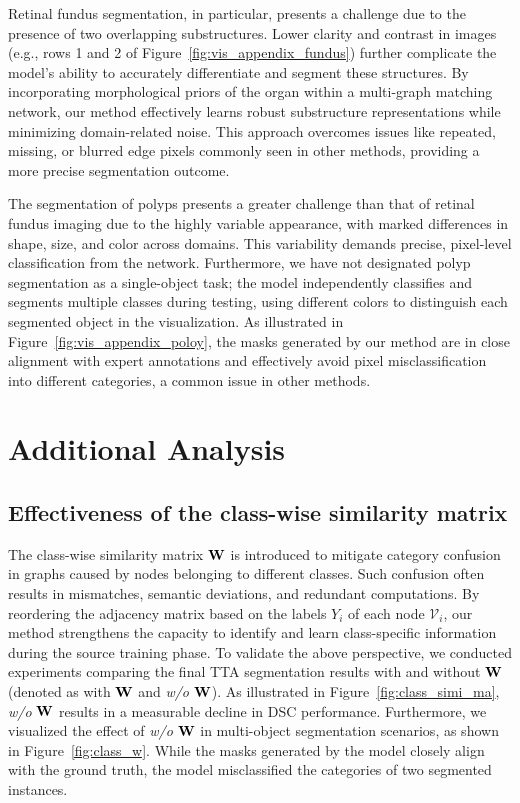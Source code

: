 Retinal fundus segmentation, in particular, presents a challenge due to the presence of two overlapping substructures. Lower clarity and contrast in images (e.g., rows 1 and 2 of Figure~\ref{fig:vis_appendix_fundus}) further complicate the model’s ability to accurately differentiate and segment these structures. By incorporating morphological priors of the organ within a multi-graph matching network, our method effectively learns robust substructure representations while minimizing domain-related noise. This approach overcomes issues like repeated, missing, or blurred edge pixels commonly seen in other methods, providing a more precise segmentation outcome.

The segmentation of polyps presents a greater challenge than that of retinal fundus imaging due to the highly variable appearance, with marked differences in shape, size, and color across domains. This variability demands precise, pixel-level classification from the network. Furthermore, we have not designated polyp segmentation as a single-object task; the model independently classifies and segments multiple classes during testing, using different colors to distinguish each segmented object in the visualization. As illustrated in Figure~\ref{fig:vis_appendix_poloy}, the masks generated by our method are in close alignment with expert annotations and effectively avoid pixel misclassification into different categories, a common issue in other methods.

\section{Additional Analysis}
\subsection{Effectiveness of the class-wise similarity matrix}
The class-wise similarity matrix $\bold{W}$ is introduced to mitigate category confusion in graphs caused by nodes belonging to different classes. Such confusion often results in mismatches, semantic deviations, and redundant computations. By reordering the adjacency matrix based on the labels $Y_i$ of each node $\mathcal{V}_i$, our method strengthens the capacity to identify and learn class-specific information during the source training phase.
To validate the above perspective, we conducted experiments comparing the final TTA segmentation results with and without $\bold{W}$ (denoted as with $\bold{W}$ and \textit{w/o} $\bold{W}$). As illustrated in Figure~\ref{fig:class_simi_ma}, \textit{w/o} $\bold{W}$ results in a measurable decline in DSC performance. Furthermore, we visualized the effect of \textit{w/o} $\bold{W}$ in multi-object segmentation scenarios, as shown in Figure~\ref{fig:class_w}. While the masks generated by the model closely align with the ground truth, the model misclassified the categories of two segmented instances.


